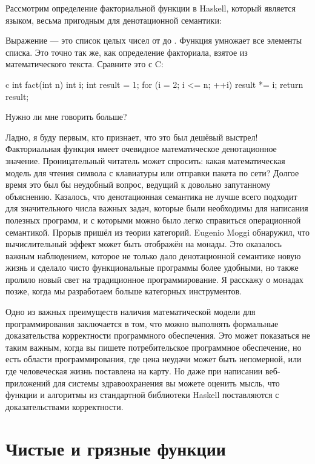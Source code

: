 Рассмотрим определение факториальной функции в Haskell, который является
языком, весьма пригодным для денотационной семантики:

Выражение \code{{[}1..n{]}} --- это список целых чисел от  до .
Функция  умножает все элементы списка. Это
точно так же, как определение факториала, взятое из математического текста. Сравните это
с C:

\begin{snip}{c}
int fact(int n) {
    int i;
    int result = 1;
    for (i = 2; i <= n; ++i)
        result *= i;
    return result;
}
\end{snip}
Нужно ли мне говорить больше?

Ладно, я буду первым, кто признает, что это был дешёвый выстрел! Факториальная
функция имеет очевидное математическое денотационное значение. Проницательный читатель может
спросить: какая математическая модель для чтения символа с
клавиатуры или отправки пакета по сети? Долгое время
это был бы неудобный вопрос, ведущий к довольно запутанному
объяснению. Казалось, что денотационная семантика не лучше всего подходит
для значительного числа важных задач, которые были необходимы для
написания полезных программ, и с которыми можно было легко справиться
операционной семантикой. Прорыв пришёл из теории категорий.
Eugenio Moggi обнаружил, что вычислительный эффект может быть отображён на
монады. Это оказалось важным наблюдением, которое не только
дало денотационной семантике новую жизнь и сделало чисто функциональные
программы более удобными, но также пролило новый свет на традиционное
программирование. Я расскажу о монадах позже, когда мы разработаем больше
категорных инструментов.

Одно из важных преимуществ наличия математической модели для
программирования заключается в том, что можно выполнять формальные доказательства
корректности программного обеспечения. Это может показаться не таким важным, когда вы
пишете потребительское программное обеспечение, но есть области программирования, где
цена неудачи может быть непомерной, или где человеческая жизнь поставлена на карту. Но
даже при написании веб-приложений для системы здравоохранения вы можете
оценить мысль, что функции и алгоритмы из стандартной
библиотеки Haskell поставляются с доказательствами корректности.

\section{Чистые и грязные функции}

